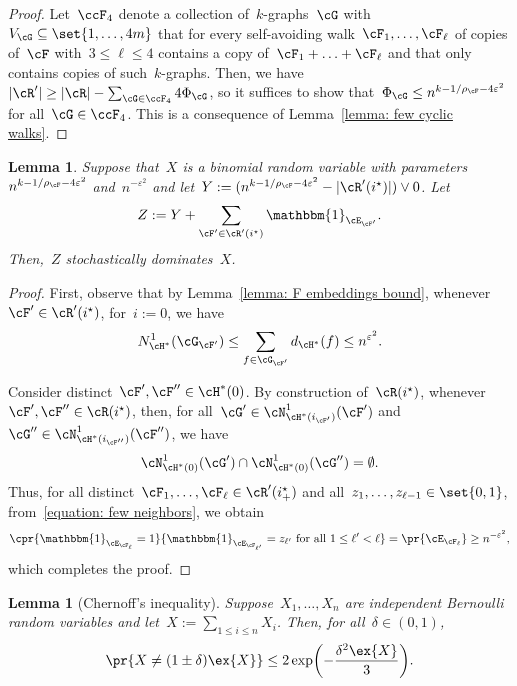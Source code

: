 \documentclass[11pt]{amsart}
\newcommand{\eps}{\varepsilon}
\DeclarePairedDelimiter{\paren}{\lparen}{\rparen}
\DeclarePairedDelimiter{\abs}{\lvert}{\rvert}
\newcommand{\ind}{\mathbbm{1}}
\newcommand{\stforall}{\text{ for all }}
\newtheorem{lemma}[algocf]{Lemma}
\theoremstyle{definition}
\numberwithin{equation}{section}
\begin{document}
\begin{proof}
		Let~$\ccF_4$ denote a collection of~$k$-graphs~$\cG$ with~$V_\cG\subseteq \set{1,\ldots,4m}$ that for every self-avoiding walk~$\cF_1,\ldots,\cF_\ell$ of copies of~$\cF$ with~$3\leq\ell\leq 4$ contains a copy of~$\cF_1+\ldots+\cF_\ell$ and that only contains copies of such~$k$-graphs.
		Then, we have~$\abs{\cR'}\geq \abs{\cR}-\sum_{\cG\in\ccF_4}4\Phi_{\cG}$, so it suffices to show that~$\Phi_{\cG}\leq n^{k-1/\rho_\cF-4\eps^{2}}$ for all~$\cG\in\ccF_4$.
		This is a consequence of Lemma~\ref{lemma: few cyclic walks}.
	\end{proof}
	
	\begin{lemma}\label{lemma: remain configuration dominance}
		Suppose that~$X$ is a binomial random variable with parameters~$n^{k-1/\rho_\cF-4\eps^{2}}$ and~$n^{-\eps^{2}}$ and let~$Y:=(n^{k-1/\rho_\cF-4\eps^{2}}-\abs{\cR'(i^\star)})\vee 0$.
		Let
		\begin{equation*}
			Z:=Y+\sum_{\cF'\in\cR'(i^\star)} \ind_{\cE_{\cF'}}.
		\end{equation*}
		Then,~$Z$ stochastically dominates~$X$.
	\end{lemma}
	\begin{proof}
		First, observe that by Lemma~\ref{lemma: F embeddings bound}, whenever~$\cF'\in\cR'(i^\star)$, for~$i:=0$, we have
		\begin{equation}\label{equation: few neighbors}
			N^1_{\cH^*}(\cG_{\cF'})
			\leq \sum_{f\in\cG_{\cF'}} d_{\cH^*}(f)
			\leq n^{\eps^{2}}.
		\end{equation}
		
		Consider distinct~$\cF',\cF''\in\cH^*(0)$.
		By construction of~$\cR(i^\star)$, whenever~$\cF',\cF''\in\cR(i^\star)$, then, for all~$\cG'\in\cN^1_{\cH^*(i_{\cF'})}(\cF')$ and~$\cG''\in\cN^1_{\cH^*(i_{\cF''})}(\cF'')$, we have
		\begin{equation*}
			\cN^1_{\cH^*(0)}(\cG')\cap \cN^1_{\cH^*(0)}(\cG'')=\emptyset.
		\end{equation*}
		Thus, for all distinct~$\cF_1,\ldots,\cF_{\ell}\in\cR'(i^\star_+)$ and all~$z_1,\ldots,z_{\ell-1}\in\set{0,1}$, from~\eqref{equation: few neighbors}, we obtain
		\begin{equation*}
			\cpr{ \ind_{\cE_{\cF_{\ell}}}=1 }{ \ind_{\cE_{\cF_{\ell'}}}=z_{\ell'}\stforall 1\leq \ell'<\ell }
			= \pr{ \cE_{\cF_{\ell}} }
			\geq n^{-\eps^{2}},
		\end{equation*}
		which completes the proof.
	\end{proof}
	
	\begin{lemma}[Chernoff's inequality]\label{lemma: chernoff}
		Suppose~$X_1,\ldots,X_n$ are independent Bernoulli random variables and let~$X:= \sum_{1\leq i\leq n} X_i$.
		Then, for all~$\delta\in(0,1)$,
		\begin{equation*}
			\pr{X\neq (1\pm\delta)\ex{X}}\leq 2\exp\paren[\bigg]{-\frac{\delta^2\ex{X}}{3}}.
		\end{equation*}
	\end{lemma}
	
\end{document}
